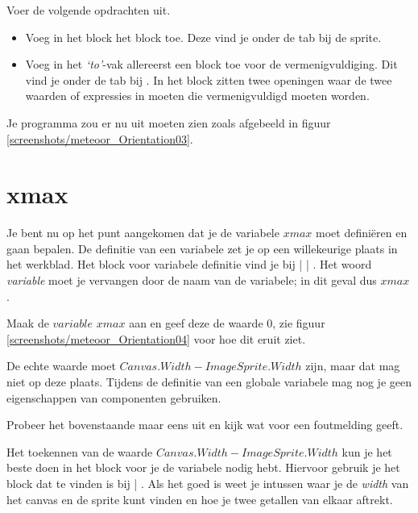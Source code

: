 \begin{opgave}
    \opgVraag
  Voer de volgende opdrachten uit.
  \begin{itemize}
    \item Voeg in het   block het  block toe. Deze vind je onder de  tab bij de sprite.
    \item Voeg in het \emph{`to'}-vak allereerst een block toe voor de vermenigvuldiging. Dit vind je onder de  tab bij . In het \block{$\times$} block zitten twee openingen waar de twee waarden of expressies in moeten die vermenigvuldigd moeten worden.
  \end{itemize}
\end{opgave}

Je programma zou er nu uit moeten zien zoals afgebeeld in figuur \ref{screenshots/meteoor_Orientation03}.



\section{xmax}
Je bent nu op het punt aangekomen dat je de variabele $xmax$ moet defini\"eren en gaan bepalen. De definitie van een variabele zet je op een willekeurige plaats in het werkblad. Het block voor variabele definitie vind je bij  |  | . Het woord \emph{variable} moet je vervangen door de naam van de variabele; in dit geval dus $xmax$.

\begin{opgave}
    \opgVraag
  Maak de $variable$ $xmax$ aan en geef deze de waarde $0$, zie figuur \ref{screenshots/meteoor_Orientation04} voor hoe dit eruit ziet.
\end{opgave}

De echte waarde moet $Canvas.Width - ImageSprite.Width$ zijn, maar dat mag niet op deze plaats. Tijdens de definitie van een globale variabele mag nog je geen eigenschappen van componenten gebruiken.

\begin{opgave}
    \opgVraag
  Probeer het bovenstaande maar eens uit en kijk wat \ai voor een foutmelding geeft.
\end{opgave}

Het toekennen van de waarde $Canvas.Width - ImageSprite.Width$ kun je het beste doen in het  block voor je de variabele nodig hebt. Hiervoor gebruik je het  block dat te vinden is bij  | . Als het goed is weet je intussen waar je de \emph{width} van het canvas en de sprite kunt vinden en hoe je twee getallen van elkaar aftrekt.


